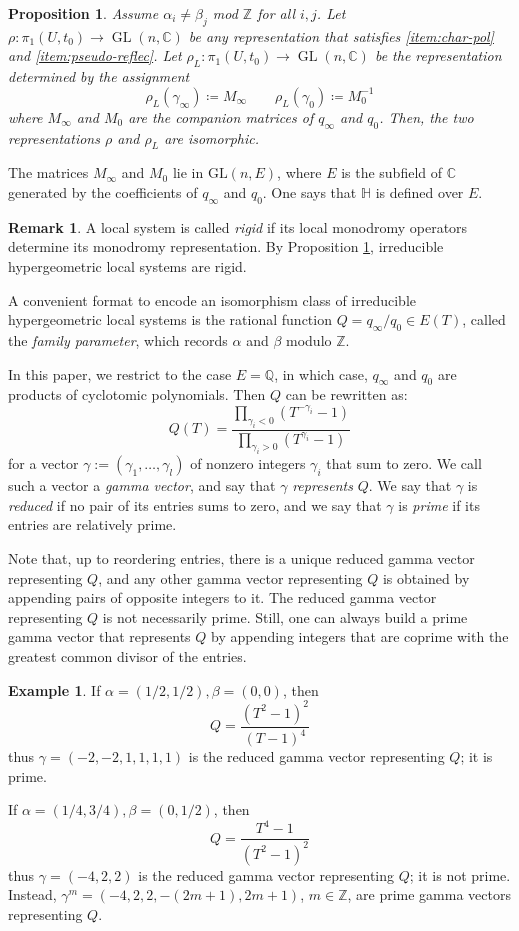 \documentclass[11pt, reqno]{amsart}
\theoremstyle{plain}
\newtheorem{prop}[thm]{Proposition}
\theoremstyle{definition}
\newtheorem{rem}[thm]{Remark}
\newtheorem{example}[thm]{Example}
\newcommand{\CC}{\mathbb{C}}
\newcommand{\ZZ}{\mathbb{Z}}
\newcommand{\QQ}{\mathbb{Q}}
\newcommand{\HH}{\mathbb{H}}
\DeclareMathOperator{\GL}{GL}
\begin{document}
\begin{prop}{\cite[Theorem 1.1]{Levelt}}
\label{pro:levelt} 
Assume $\alpha_i \neq \beta_j$ mod $\ZZ$ for all $i, j$.
Let $\rho \colon \pi_1(U, t_0) \to \GL(n,\CC)$ be any representation that satisfies \eqref{item:char-pol} and \eqref{item:pseudo-reflec}.
Let 
$
\rho_L \colon \pi_1(U, t_0) \to \GL(n,\CC)
$
be the representation determined by the assignment \[\rho_L(\gamma_\infty)\coloneqq M_\infty \qquad 
\rho_L(\gamma_0)\coloneqq M_0^{-1}\]
where $M_\infty$ and $M_0$ are the companion matrices of $q_\infty$ and $q_0$. 
Then, the two representations $\rho$ and $ \rho_L$ are isomorphic.
\end{prop}

The matrices $M_\infty$ and $M_0$ lie in $\mathrm{GL}(n, E)$, where $E$ is the subfield of $\CC$ generated by the coefficients of $q_\infty$ and $q_0$. One says that $\HH$ is defined over $E$.  
\begin{rem}
\label{rem:rigid}
A local system is called \emph{rigid} if its local monodromy operators determine its monodromy representation. 
By Proposition \ref{pro:levelt}, irreducible hypergeometric local systems are rigid.    
\end{rem}

A convenient format to encode an isomorphism class of irreducible hypergeometric local systems is the rational function $Q=q_\infty/ q_0 \in E(T)$, called the \emph{family parameter}, which records $\alpha$ and $\beta$ modulo $\ZZ$. 
\smallskip 

In this paper, we restrict to the case $E=\QQ$, in which case, $q_\infty$ and $q_0$ are products of cyclotomic polynomials.
Then $Q$ can be rewritten 
as:
\begin{equation}\label{eq:Q-gamma}
Q(T)= 
\frac{\prod_{\gamma_i<0} (T^{-\gamma_i}-1)}{\prod_{\gamma_i>0} (T^{\gamma_i}-1)}
\end{equation}
for a vector $\gamma:=(\gamma_1,\ldots,\gamma_l)$ of nonzero integers $\gamma_i$ that sum to zero. 
We call such a vector a \emph{gamma vector}, and say that $\gamma$ \emph{represents} $Q$. 
We say that $\gamma$ is \emph{reduced} if no pair of its entries sums to zero, and we say that $\gamma$ is \emph{prime} if its entries are relatively prime.  

Note that, up to reordering entries, there is a unique reduced gamma vector representing $Q$, 
and any other gamma vector representing $Q$ is obtained by appending pairs of opposite integers to it. The reduced gamma vector representing $Q$ is not necessarily prime. Still, one can always build a prime gamma vector that represents $Q$ by appending integers that are coprime with the greatest common divisor of the entries. 
\begin{example}
\label{exa:Q-gamma}
If $\alpha=(1/2, 1/2), \beta=(0,0)$,
then \[
Q=\frac{(T^2-1)^2}{(T-1)^4}
\] thus $\gamma=(-2,-2,1,1,1,1)$  is the reduced gamma vector representing $Q$; it is prime. 

If $\alpha=(1/4, 3/4), \beta=(0, 1/2)$,
then \[
Q=\frac{T^4-1}{(T^2-1)^2}
\] thus $\gamma=(-4,2,2)$ is the reduced gamma vector representing $Q$; it is not prime. Instead, $\gamma^m=(-4,2,2,-(2m+1),2m+1)$, $m\in \ZZ$, are prime gamma vectors representing $Q$. 
\end{example}
\end{document}
